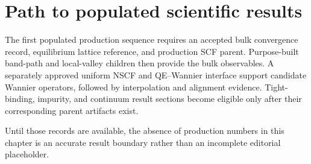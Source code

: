\section{Path to populated scientific results}

The first populated production sequence requires an accepted bulk convergence
record, equilibrium lattice reference, and production SCF parent. Purpose-built
band-path and local-valley children then provide the bulk observables. A
separately approved uniform NSCF and QE--Wannier interface support candidate
Wannier operators, followed by interpolation and alignment evidence. Tight-
binding, impurity, and continuum result sections become eligible only after
their corresponding parent artifacts exist.

Until those records are available, the absence of production numbers in this
chapter is an accurate result boundary rather than an incomplete editorial
placeholder.
